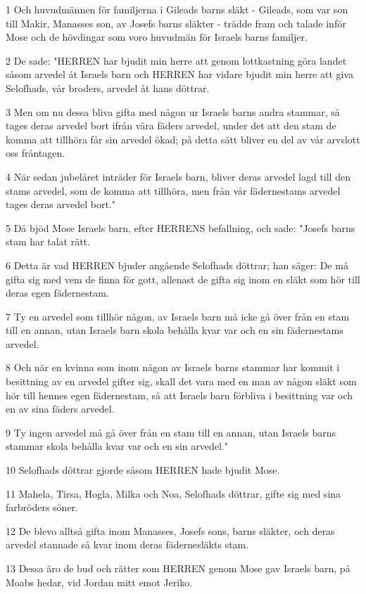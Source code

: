 \par 1 Och huvudmännen för familjerna i Gileads barns släkt - Gileads, som var son till Makir, Manasses son, av Josefs barns släkter - trädde fram och talade inför Mose och de hövdingar som voro huvudmän för Israels barns familjer.
\par 2 De sade: "HERREN har bjudit min herre att genom lottkastning göra landet såsom arvedel åt Israels barn och HERREN har vidare bjudit min herre att giva Selofhads, vår broders, arvedel åt hans döttrar.
\par 3 Men om nu dessa bliva gifta med någon ur Israels barns andra stammar, så tages deras arvedel bort ifrån våra fäders arvedel, under det att den stam de komma att tillhöra får sin arvedel ökad; på detta sätt bliver en del av vår arvslott oss fråntagen.
\par 4 När sedan jubelåret inträder för Israels barn, bliver deras arvedel lagd till den stams arvedel, som de komma att tillhöra, men från vår fädernestams arvedel tages deras arvedel bort."
\par 5 Då bjöd Mose Israels barn, efter HERRENS befallning, och sade: "Josefs barns stam har talat rätt.
\par 6 Detta är vad HERREN bjuder angående Selofhads döttrar; han säger: De må gifta sig med vem de finna för gott, allenast de gifta sig inom en släkt som hör till deras egen fädernestam.
\par 7 Ty en arvedel som tillhör någon, av Israels barn må icke gå över från en stam till en annan, utan Israels barn skola behålla kvar var och en sin fädernestams arvedel.
\par 8 Och när en kvinna som inom någon av Israels barns stammar har kommit i besittning av en arvedel gifter sig, skall det vara med en man av någon släkt som hör till hennes egen fädernestam, så att Israels barn förbliva i besittning var och en av sina fäders arvedel.
\par 9 Ty ingen arvedel må gå över från en stam till en annan, utan Israels barns stammar skola behålla kvar var och en sin arvedel."
\par 10 Selofhads döttrar gjorde såsom HERREN hade bjudit Mose.
\par 11 Mahela, Tirsa, Hogla, Milka och Noa, Selofhads döttrar, gifte sig med sina farbröders söner.
\par 12 De blevo alltså gifta inom Manasses, Josefs sons, barns släkter, och deras arvedel stannade så kvar inom deras fädernesläkts stam.
\par 13 Dessa äro de bud och rätter som HERREN genom Mose gav Israels barn, på Moabs hedar, vid Jordan mitt emot Jeriko.


